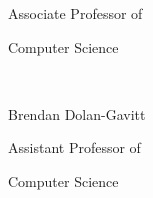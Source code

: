 {\hspace{3.2 in} Associate Professor of

\vspace{-.2 in}

\hspace{3.2 in} Computer Science 



\vspace{.2 in plus 1fill}

\hspace{3.2 in} \hrulefill\

\vspace{-.2 in}

\hspace{3.2 in} Brendan Dolan-Gavitt
\vspace{-.1 in}

\hspace{3.2 in} Assistant Professor of
\vspace{-.2 in}

\hspace{3.2 in} Computer Science

\vspace{0 in plus 1fill}

}
